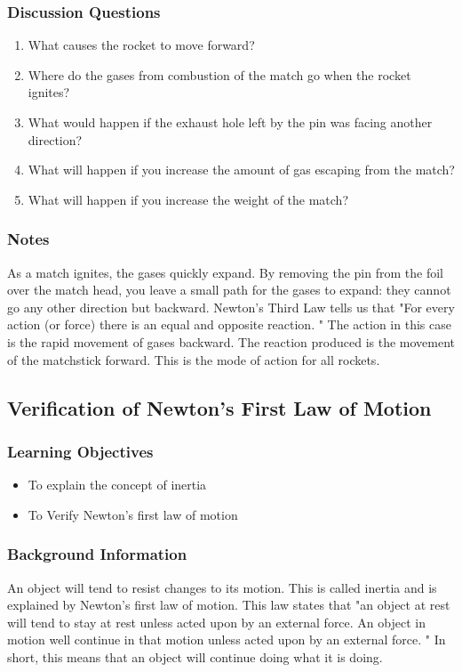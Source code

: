 \subsubsection*{Discussion Questions}
\begin{enumerate}
\item{What causes the rocket to move forward?}
\item{Where do the gases from combustion of the match go when the rocket ignites?}
\item{What would happen if the exhaust hole left by the pin was facing another direction?}
\item{What will happen if you increase the amount of gas escaping from the match?}
\item{What will happen if you increase the weight of the match?}
\end{enumerate}

\subsubsection*{Notes}
As a match ignites, the gases quickly expand. By removing the pin from the foil over the match head, you leave a small path for the gases to expand: they cannot go any other direction but backward. Newton's Third Law tells us that "For every action (or force) there is an equal and opposite reaction.  " The action in this case is the rapid movement of gases backward. The reaction produced is the movement of the matchstick forward. This is the mode of action for all rockets.  

\subsection{Verification of Newton's First Law of Motion}

\subsubsection*{Learning Objectives}
\begin{itemize}
\item{To explain the concept of inertia} 
\item{To Verify Newton's first law of motion} 
\end{itemize}

\subsubsection*{Background Information}
An object will tend to resist changes to its motion. This is called inertia and is explained by Newton's first law of motion. This law states that "an object at rest will tend to stay at rest unless acted upon by an external force. An object in motion well continue in that motion unless acted upon by an external force.  " In short, this means that an object will continue doing what it is doing.  

